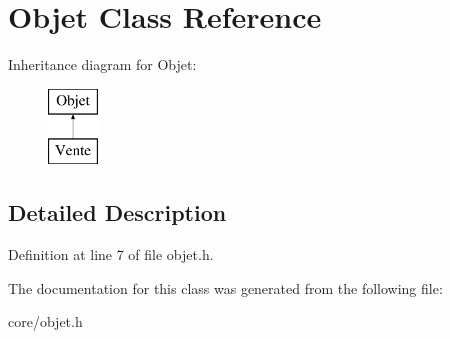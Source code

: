 \hypertarget{class_objet}{
\section{Objet Class Reference}
\label{class_objet}
}
Inheritance diagram for Objet:\begin{figure}[H]
\begin{center}
\leavevmode
\includegraphics[height=2.000000cm]{class_objet}
\end{center}
\end{figure}


\subsection{Detailed Description}


Definition at line 7 of file objet.h.



The documentation for this class was generated from the following file:\begin{DoxyCompactItemize}
\item 
core/objet.h\end{DoxyCompactItemize}
